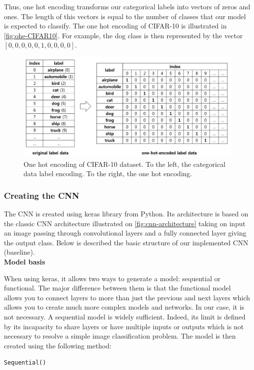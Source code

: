 \documentclass[11pt, openany]{report}
\theoremstyle{plain}
\theoremstyle{definition}
\theoremstyle{remark}
\begin{document}
Thus, one hot encoding transforms our categorical labels into vectors of zeros and ones. The length of this vectors is equal to the number of classes that our model is expected to classify. The one hot encoding of CIFAR-10 is illustrated in \autoref{fig:ohe-CIFAR10}. For example, the dog class is then represented by the vector $[0,0,0,0,0,1,0,0,0,0]$.  

\begin{figure}[h]
  \centering
  \includegraphics[scale=0.55]{figures/ohe-cifar10.png}
  \caption{One hot encoding of CIFAR-10 dataset. To the left, the categorical data label encoding. To the right, the one hot encoding.}
  \label{fig:ohe-CIFAR10}
\end{figure}

\subsubsection{Creating the CNN}

The CNN is created using keras library from Python. Its architecture is based on the classic CNN architecture illustrated on \autoref{fig:cnn-architecture} taking on input an image passing through convolutional layers and a fully connected layer giving the output class. Below is described the basic structure of our implemented CNN (baseline). \\

\textbf{Model basis}

When using keras, it allows two ways to generate a model: sequential or functional. The major difference between them is that the functional model allows you to connect layers to more than just the previous and next layers which allows you to create much more complex models and networks. In our case, it is not necessary. A sequential model is widely sufficient. Indeed, its limit is defined by its incapacity to share layers or have multiple inputs or outputs which is not necessary to resolve a simple image classification problem. The model is then created using the following method: 
\begin{center}
\texttt{Sequential()}
\end{center} 
\end{document}
